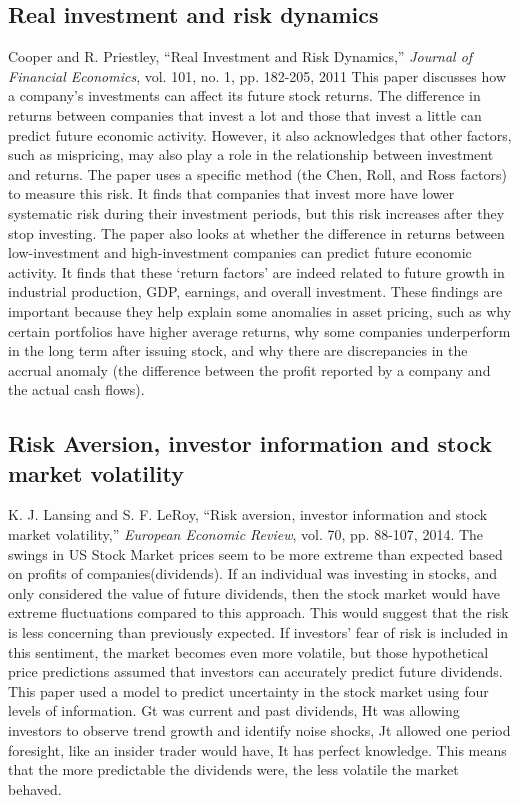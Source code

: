 \documentclass[12pt]{article}
\begin{document}
\subsection{Real investment and risk dynamics}
Cooper and R. Priestley, “Real Investment and Risk Dynamics,” \textit{Journal of Financial Economics}, vol. 101, no. 1, pp. 182-205, 2011
\newline
This paper discusses how a company’s investments can affect its future stock returns. The difference in returns between companies that invest a lot and those that invest a little can predict future economic activity. However, it also acknowledges that other factors, such as mispricing, may also play a role in the relationship between investment and returns. 
The paper uses a specific method (the Chen, Roll, and Ross factors) to measure this risk. It finds that companies that invest more have lower systematic risk during their investment periods, but this risk increases after they stop investing.
The paper also looks at whether the difference in returns between low-investment and high-investment companies can predict future economic activity. It finds that these ‘return factors’ are indeed related to future growth in industrial production, GDP, earnings, and overall investment.
These findings are important because they help explain some anomalies in asset pricing, such as why certain portfolios have higher average returns, why some companies underperform in the long term after issuing stock, and why there are discrepancies in the accrual anomaly (the difference between the profit reported by a company and the actual cash flows).

\subsection{Risk Aversion, investor information and stock market volatility}
K. J. Lansing and S. F. LeRoy, “Risk aversion, investor information and stock market volatility,” \textit{European Economic Review}, vol. 70, pp. 88-107, 2014. 
\newline
The swings in US Stock Market prices seem to be more extreme than expected based on profits of companies(dividends). If an individual was investing in stocks, and only considered the value of future dividends, then the stock market would have extreme fluctuations compared to this approach. This would suggest that the risk is less concerning than previously expected. If investors’ fear of risk is included in this sentiment, the market becomes even more volatile, but those hypothetical price predictions assumed that investors can accurately predict future dividends. This paper used a model to predict uncertainty in the stock market using four levels of information. Gt was current and past dividends, Ht was allowing investors to observe trend growth and identify noise shocks, Jt allowed one period foresight, like an insider trader would have, It has perfect knowledge. This means that the more predictable the dividends were, the less volatile the market behaved. 
\end{document}

